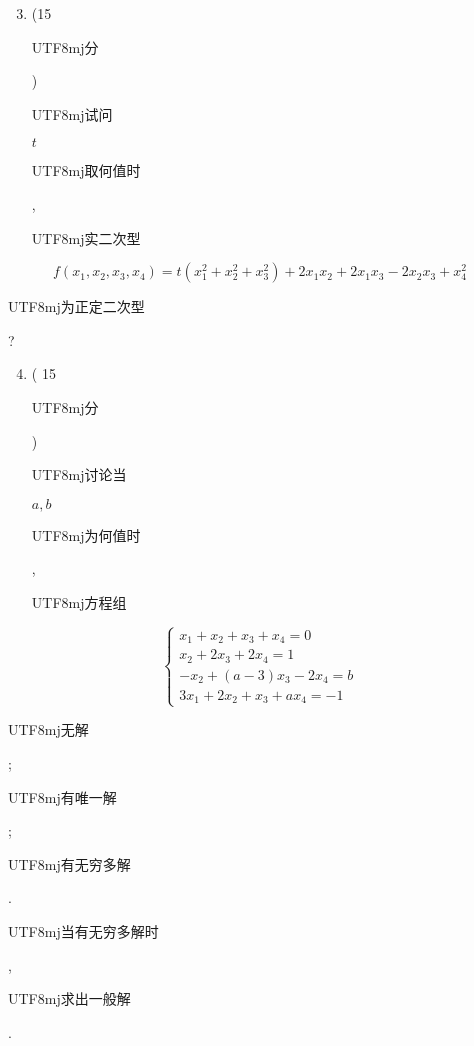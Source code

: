 \documentclass[10pt]{article}
\begin{document}
\begin{enumerate}
  \setcounter{enumi}{2}
  \item (15 \begin{CJK}{UTF8}{mj}分\end{CJK}) \begin{CJK}{UTF8}{mj}试问\end{CJK} $t$ \begin{CJK}{UTF8}{mj}取何值时\end{CJK}, \begin{CJK}{UTF8}{mj}实二次型\end{CJK}
\end{enumerate}
$$
f\left(x_{1}, x_{2}, x_{3}, x_{4}\right)=t\left(x_{1}^{2}+x_{2}^{2}+x_{3}^{2}\right)+2 x_{1} x_{2}+2 x_{1} x_{3}-2 x_{2} x_{3}+x_{4}^{2}
$$
\begin{CJK}{UTF8}{mj}为正定二次型\end{CJK}?

\begin{enumerate}
  \setcounter{enumi}{3}
  \item ( 15 \begin{CJK}{UTF8}{mj}分\end{CJK}) \begin{CJK}{UTF8}{mj}讨论当\end{CJK} $a, b$ \begin{CJK}{UTF8}{mj}为何值时\end{CJK}, \begin{CJK}{UTF8}{mj}方程组\end{CJK}
\end{enumerate}
$$
\left\{\begin{array}{l}
x_{1}+x_{2}+x_{3}+x_{4}=0 \\
x_{2}+2 x_{3}+2 x_{4}=1 \\
-x_{2}+(a-3) x_{3}-2 x_{4}=b \\
3 x_{1}+2 x_{2}+x_{3}+a x_{4}=-1
\end{array}\right.
$$
\begin{CJK}{UTF8}{mj}无解\end{CJK}; \begin{CJK}{UTF8}{mj}有唯一解\end{CJK}; \begin{CJK}{UTF8}{mj}有无穷多解\end{CJK}. \begin{CJK}{UTF8}{mj}当有无穷多解时\end{CJK}, \begin{CJK}{UTF8}{mj}求出一般解\end{CJK}.
\end{document}

